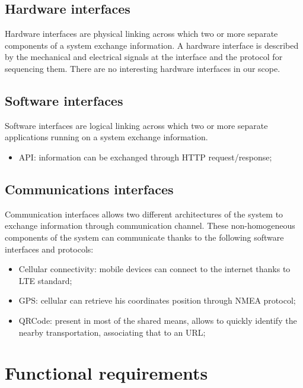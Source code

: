 \subsection{Hardware interfaces}
Hardware interfaces are physical linking across which two or more separate components of a system exchange information. A hardware interface is described by the mechanical and electrical signals at the interface and the protocol for sequencing them. There are no interesting hardware interfaces in our scope.

\subsection{Software interfaces}
Software interfaces are logical linking across which two or more separate applications running on a system exchange information. 
\begin{itemize}
\item API: information can be exchanged through HTTP request/response;
\end{itemize}

\subsection{Communications interfaces}
Communication interfaces allows two different architectures of the system to exchange information through communication channel. These non-homogeneous components of the system can communicate thanks to the following software interfaces and protocols:
\begin{itemize}
\item Cellular connectivity: mobile devices can connect to the internet thanks to LTE standard;
\item GPS: cellular can retrieve his coordinates position through NMEA protocol;
\item QRCode: present in most of the shared means, allows to quickly identify the nearby transportation, associating that to an URL;
\end{itemize}


\section{Functional requirements}
